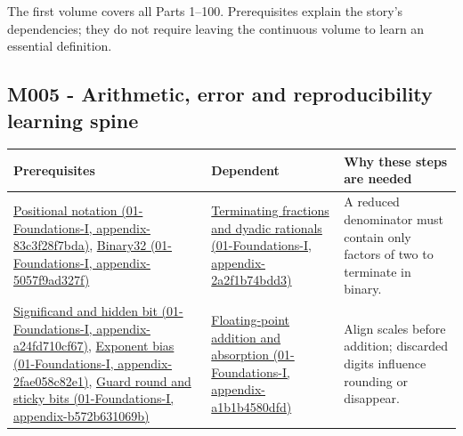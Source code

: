 The first volume covers all Parts 1--100. Prerequisites explain the story's dependencies; they do not require leaving the continuous volume to learn an essential definition.

\subsection{M005 - Arithmetic, error and reproducibility learning spine}\label{appendix-4ad47bdd269a-m005---arithmetic-error-and-reproducibility-learning-spine}

{\def\LTcaptype{none} %
\begin{longtable}[]{@{}
  >{\raggedright\arraybackslash}p{}
  >{\raggedright\arraybackslash}p{}
  >{\raggedright\arraybackslash}p{}@{}}
\toprule\noalign{}
\begin{minipage}[b]{\linewidth}\raggedright
Prerequisites
\end{minipage} & \begin{minipage}[b]{\linewidth}\raggedright
Dependent
\end{minipage} & \begin{minipage}[b]{\linewidth}\raggedright
Why these steps are needed
\end{minipage} \\
\midrule\noalign{}
\endhead
\bottomrule\noalign{}
\endlastfoot
\href{../01-Foundations-I/main.pdf\#nameddest=appendix-83c3f28f7bda}{Positional notation (01-Foundations-I, appendix-83c3f28f7bda)}, \href{../01-Foundations-I/main.pdf\#nameddest=appendix-5057f9ad327f}{Binary32 (01-Foundations-I, appendix-5057f9ad327f)} & \href{../01-Foundations-I/main.pdf\#nameddest=appendix-2a2f1b74bdd3}{Terminating fractions and dyadic rationals (01-Foundations-I, appendix-2a2f1b74bdd3)} & A reduced denominator must contain only factors of two to terminate in binary. \\
\href{../01-Foundations-I/main.pdf\#nameddest=appendix-a24fd710cf67}{Significand and hidden bit (01-Foundations-I, appendix-a24fd710cf67)}, \href{../01-Foundations-I/main.pdf\#nameddest=appendix-2fae058c82e1}{Exponent bias (01-Foundations-I, appendix-2fae058c82e1)}, \href{../01-Foundations-I/main.pdf\#nameddest=appendix-b572b631069b}{Guard round and sticky bits (01-Foundations-I, appendix-b572b631069b)} & \href{../01-Foundations-I/main.pdf\#nameddest=appendix-a1b1b4580dfd}{Floating-point addition and absorption (01-Foundations-I, appendix-a1b1b4580dfd)} & Align scales before addition; discarded digits influence rounding or disappear. \\

\end{longtable}}
